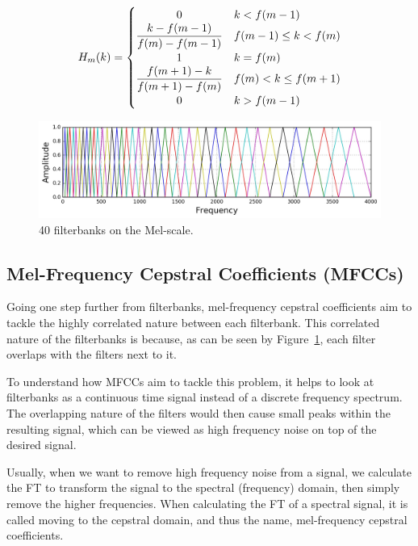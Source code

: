 \begin{equation}
    H_m(k) =
  \begin{cases}
      \hfil 0 & k < f(m - 1) \\
      \dfrac{k - f(m - 1)}{f(m) - f(m - 1)} & f(m - 1) \leq k < f(m) \\
      \hfil {1} & k = f(m) \\
      \dfrac{f(m + 1) - k}{f(m + 1) - f(m)} & f(m) < k \leq f(m + 1) \\
      \hfil {0} & k > f(m - 1) \\
  \end{cases}
\end{equation}

\begin{figure}[ht]
    \centering
    \includegraphics[width=0.9\linewidth]{content/fig/mel_filters.jpg}
    \caption{40 filterbanks on the Mel-scale.\cite{fayek_2016}}
    \label{fig:mel_filters}
\end{figure}

\subsection{Mel-Frequency Cepstral Coefficients (MFCCs)}

Going one step further from filterbanks, mel-frequency cepstral coefficients aim to tackle the highly correlated nature between each filterbank. 
This correlated nature of the filterbanks is because, as can be seen by Figure~\ref{fig:mel_filters}, each filter overlaps with the filters next to it.

To understand how MFCCs aim to tackle this problem, it helps to look at filterbanks as a continuous time signal instead of a discrete frequency spectrum.
The overlapping nature of the filters would then cause small peaks within the resulting signal, which can be viewed as high frequency noise on top of the desired signal.

Usually, when we want to remove high frequency noise from a signal, we calculate the FT to transform the signal to the spectral (frequency) domain, then simply remove the higher frequencies. 
When calculating the FT of a spectral signal, it is called moving to the cepstral domain, and thus the name, mel-frequency cepstral coefficients.

